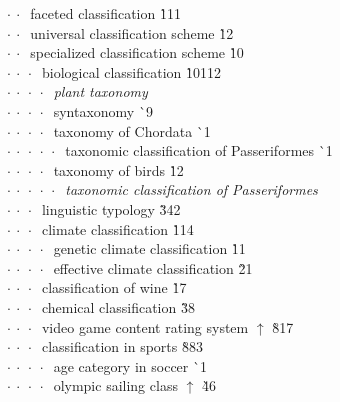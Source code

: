 \begin{tabbing}
$\cdot\:\cdot\:$  faceted classification  \` 1{\raisebox{.4\height}{\scalebox{.6}{+}}}11\\
$\cdot\:\cdot\:$  universal classification scheme  \` 12\\
$\cdot\:\cdot\:$  specialized classification scheme  \` 10\\
$\cdot\:\cdot\:\cdot\:$  biological classification  \` 10{\raisebox{.4\height}{\scalebox{.6}{+}}}112\\
$\cdot\:\cdot\:\cdot\:\cdot\:$  \textit{plant taxonomy}\\
$\cdot\:\cdot\:\cdot\:\cdot\:$  syntaxonomy  \` {\raisebox{.4\height}{\scalebox{.6}{+}}}9\\
$\cdot\:\cdot\:\cdot\:\cdot\:$  taxonomy of Chordata  \` {\raisebox{.4\height}{\scalebox{.6}{+}}}1\\
$\cdot\:\cdot\:\cdot\:\cdot\:\cdot\:$  taxonomic classification of Passeriformes  \` {\raisebox{.4\height}{\scalebox{.6}{+}}}1\\
$\cdot\:\cdot\:\cdot\:\cdot\:$  taxonomy of birds  \` 1{\raisebox{.4\height}{\scalebox{.6}{+}}}2\\
$\cdot\:\cdot\:\cdot\:\cdot\:\cdot\:$  \textit{taxonomic classification of Passeriformes}\\
$\cdot\:\cdot\:\cdot\:$  linguistic typology  \` 3{\raisebox{.4\height}{\scalebox{.6}{+}}}42\\
$\cdot\:\cdot\:\cdot\:$  climate classification  \` 1{\raisebox{.4\height}{\scalebox{.6}{+}}}14\\
$\cdot\:\cdot\:\cdot\:\cdot\:$  genetic climate classification  \` 1{\raisebox{.4\height}{\scalebox{.6}{+}}}1\\
$\cdot\:\cdot\:\cdot\:\cdot\:$  effective climate classification  \` 2{\raisebox{.4\height}{\scalebox{.6}{+}}}1\\
$\cdot\:\cdot\:\cdot\:$  classification of wine  \` 1{\raisebox{.4\height}{\scalebox{.6}{+}}}7\\
$\cdot\:\cdot\:\cdot\:$  chemical classification  \` 3{\raisebox{.4\height}{\scalebox{.6}{+}}}8\\
$\cdot\:\cdot\:\cdot\:$  video game content rating system $\uparrow$ \` 8{\raisebox{.4\height}{\scalebox{.6}{+}}}17\\
$\cdot\:\cdot\:\cdot\:$  classification in sports  \` 88{\raisebox{.4\height}{\scalebox{.6}{+}}}3\\
$\cdot\:\cdot\:\cdot\:\cdot\:$  age category in soccer  \` {\raisebox{.4\height}{\scalebox{.6}{+}}}1\\
$\cdot\:\cdot\:\cdot\:\cdot\:$  olympic sailing class $\uparrow$ \` 4{\raisebox{.4\height}{\scalebox{.6}{+}}}6\\

\end{tabbing}
